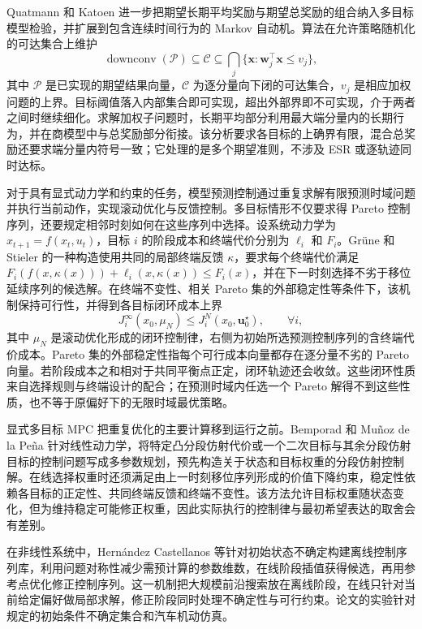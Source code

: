 Quatmann 和 Katoen 进一步把期望长期平均奖励与期望总奖励的组合纳入多目标模型检验，并扩展到包含连续时间行为的 Markov 自动机\cite{quatmann2021longrun}。算法在允许策略随机化的可达集合上维护
\begin{equation}
\operatorname{downconv}(\mathcal P)\subseteq\mathcal C\subseteq
\bigcap_j\{\mathbf x:\mathbf w_j^\top\mathbf x\leq v_j\},
\end{equation}
其中 $\mathcal P$ 是已实现的期望结果向量，$\mathcal C$ 为逐分量向下闭的可达集合，$v_j$ 是相应加权问题的上界。目标阈值落入内部集合即可实现，超出外部界即不可实现，介于两者之间时继续细化。求解加权子问题时，长期平均部分利用最大端分量内的长期行为，并在商模型中与总奖励部分衔接。该分析要求各目标的上确界有限，混合总奖励还要求端分量内符号一致；它处理的是多个期望准则，不涉及 ESR 或逐轨迹同时达标。

对于具有显式动力学和约束的任务，模型预测控制通过重复求解有限预测时域问题并执行当前动作，实现滚动优化与反馈控制。多目标情形不仅要求得 Pareto 控制序列，还要规定相邻时刻如何在这些序列中选择。设系统动力学为 $x_{t+1}=f(x_t,u_t)$，目标 $i$ 的阶段成本和终端代价分别为 $\ell_i$ 和 $F_i$。Grüne 和 Stieler 的一种构造使用共同的局部终端反馈 $\kappa$，要求每个终端代价满足 $F_i(f(x,\kappa(x)))+\ell_i(x,\kappa(x))\leq F_i(x)$，并在下一时刻选择不劣于移位延续序列的候选解\cite{gruene2019}。在终端不变性、相关 Pareto 集的外部稳定性等条件下，该机制保持可行性，并得到各目标闭环成本上界
\begin{equation}
J_i^\infty(x_0,\mu_N)
\leq J_i^N(x_0,\mathbf u_0^\star),\qquad \forall i,
\end{equation}
其中 $\mu_N$ 是滚动优化形成的闭环控制律，右侧为初始所选预测控制序列的含终端代价成本。Pareto 集的外部稳定性指每个可行成本向量都存在逐分量不劣的 Pareto 向量。若阶段成本之和相对于共同平衡点正定，闭环轨迹还会收敛。这些闭环性质来自选择规则与终端设计的配合；在预测时域内任选一个 Pareto 解得不到这些性质，也不等于原偏好下的无限时域最优策略。

显式多目标 MPC 把重复优化的主要计算移到运行之前。Bemporad 和 Muñoz de la Peña 针对线性动力学，将特定凸分段仿射代价或一个二次目标与其余分段仿射目标的控制问题写成多参数规划，预先构造关于状态和目标权重的分段仿射控制解\cite{bemporad2009mompc}。在线选择权重时还须满足由上一时刻移位序列形成的价值下降约束，稳定性依赖各目标的正定性、共同终端反馈和终端不变性。该方法允许目标权重随状态变化，但为维持稳定可能修正权重，因此实际执行的控制律与最初希望表达的取舍会有差别。

在非线性系统中，Hernández Castellanos 等针对初始状态不确定构建离线控制序列库，利用问题对称性减少需预计算的参数维数，在线阶段插值获得候选，再用参考点优化修正控制序列\cite{hernandez2020explicit}。这一机制把大规模前沿搜索放在离线阶段，在线只针对当前给定偏好做局部求解，修正阶段同时处理不确定性与可行约束。论文的实验针对规定的初始条件不确定集合和汽车机动仿真。

